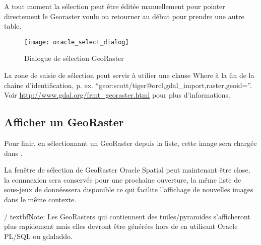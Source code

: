 
A tout moment la sélection peut être éditée manuellement pour pointer directement le Georaster voulu ou retourner au début pour prendre une autre table.

\begin{figure}[ht]
\centering
   
   \texttt{[image: oracle\_select\_dialog]}
   \caption{Dialogue de sélection GeoRaster \nixcaption}\label{fig:oracle_select}
\end{figure}


La zone de saisie de sélection peut servir à utilier une clause Where à la fin de la chaîne d'identification, p. ex. ``geor:scott/tiger@orcl,gdal\_import,raster,geoid=''. Voir \url{http://www.gdal.org/frmt_georaster.html} pour plus d'informations.

\subsection{Afficher un GeoRaster}

Pour finir, en sélectionnant un GeoRaster depuis la liste, cette image sera chargée dans \qg.


La fenêtre de sélection de GeoRaster Oracle Spatial peut maintenant être close, la connnexion sera conservée pour une prochaine ouverture, la même liste de sous-jeux de donnéessera disponible ce qui facilite l'affichage de nouvelles images dans le même contexte.

/%
textbf{Note:} Les GeoRasters qui contiennent des tuiles/pyramides s'afficheront plus rapidement mais elles devront être générées hors de \qg en utilisant Oracle PL/SQL ou gdaladdo.

